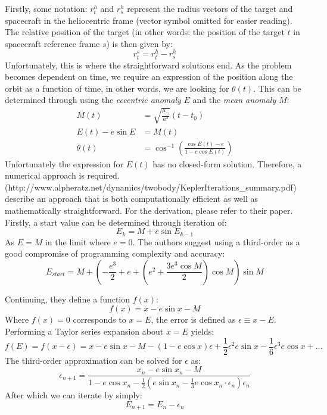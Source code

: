 \documentclass[a4paper,10pt]{article}
\begin{document}
Firstly, some notation: $r_t^h$ and $r_s^h$ represent the radius vectors of the target and spacecraft in the heliocentric frame (vector symbol omitted for easier reading). The relative position of the target (in other words: the position of the target $t$ in spacecraft reference frame $s$) is then given by:
\begin{equation}
 r_t^s = r_t^h - r_s^h
\end{equation}
Unfortunately, this is where the straightforward solutions end. As the problem becomes dependent on time, we require an expression of the position along the orbit as a function of time, in other words, we are looking for $\theta(t)$. This can be determined through using the \textit{eccentric anomaly} $E$ and the \textit{mean anomaly} $M$:
\begin{align}
 M(t) &= \sqrt{\frac{\mu_\odot}{a^3}}(t-t_0) \\
 E(t) - e \sin E &= M(t) \\
 \theta (t) &= \cos ^{-1} \left(\frac{\cos E(t) - e}{1 - e \cos E(t)}\right)
\end{align}
Unfortunately the expression for $E(t)$ has no closed-form solution. Therefore, a numerical approach is required. (http://www.alpheratz.net/dynamics/twobody/KeplerIterations\_summary.pdf) describe an approach that is both computationally efficient as well as mathematically straightforward. For the derivation, please refer to their paper. Firstly, a start value can be determined through iteration of:
\begin{equation}
 E_k = M + e\sin E_{k-1}
\end{equation}
As $E=M$ in the limit where $e=0$. The authors suggest using a third-order as a good compromise of programming complexity and accuracy:
\begin{equation}
 E_{start} = M + \left( - \frac{e^3}{2} + e + \left(e^2 + \frac{3 e^3 \cos M}{2} \right)\cos M \right)\sin M
\end{equation}



Continuing, they define a function $f(x)$:
\begin{equation}
 f(x) = x - e \sin x - M
\end{equation}
Where $f(x) = 0$ corresponds to $x = E$, the error is defined as $\epsilon \equiv x-E$. Performing a Taylor series expansion about $x=E$ yields:
\begin{equation}
 f(E) = f(x-\epsilon) = x - e \sin x - M - (1 - e \cos x)\epsilon + \frac{1}{2} \epsilon ^2 e \sin x - \frac{1}{6} \epsilon^3 e \cos x + \dots
\end{equation}
The third-order approximation can be solved for $\epsilon$ as:
\begin{equation}
 \epsilon_{n+1} = \frac{x_n - e \sin x_n - M}{1 - e \cos x_n - \frac{1}{2}\left(e \sin x_n - \frac{1}{3} e \cos x_n \cdot \epsilon_n \right)\epsilon_n}
\end{equation}
After which we can iterate by simply:
\begin{equation}
 E_{n+1} = E_n - \epsilon_n
\end{equation}
\end{document}
